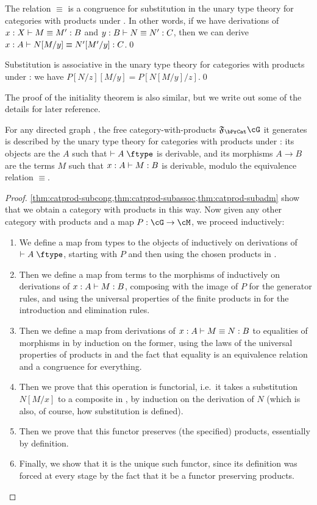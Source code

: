 \begin{lem}\label{thm:catprod-subcong}
  The relation $\equiv$ is a congruence for substitution in the unary type theory for categories with products under \cG.
  In other words, if we have derivations of $x:X \vdash M\equiv M':B$ and $y:B \vdash N\equiv N':C$, then we can derive $x:A \vdash N[M/y] \equiv N'[M'/y]:C$.\qed
\end{lem}

\begin{lem}\label{thm:catprod-subassoc}
  Substitution is associative in the unary type theory for categories with products under \cG: we have $P[N/z][M/y] = P[N[M/y]/z]$.\qed
\end{lem}

The proof of the initiality theorem is also similar, but we write out some of the details for later reference.

\begin{thm}\label{thm:catprod-initial}
  For any directed graph \cG, the free category-with-products $\F\bPrCat \cG$ it generates is described by the unary type theory for categories with products under \cG: its objects are the $A$ such that $\types A\type$ is derivable, and its morphisms $A\to B$ are the terms $M$ such that $x:A \vdash M:B$ is derivable, modulo the equivalence relation $\equiv$.
\end{thm}
\begin{proof}
  \cref{thm:catprod-subcong,thm:catprod-subassoc,thm:catprod-subadm} show that we obtain a category with products in this way.
  Now given any other category with products \cM and a map $P:\cG\to\cM$, we proceed inductively:
  \begin{enumerate}
  \item We define a map from types to the objects of \cM inductively on derivations of $\types A\type$, starting with $P$ and then using the chosen products in \cM.
  \item Then we define a map from terms to the morphisms of \cM inductively on derivations of $x:A \vdash M:B$, composing with the image of $P$ for the generator rules, and using the universal properties of the finite products in \cM for the introduction and elimination rules.
  \item Then we define a map from derivations of $x:A \vdash M\equiv N:B$ to equalities of morphisms in \cM by induction on the former, using the laws of the universal properties of products in \cM and the fact that equality is an equivalence relation and a congruence for everything.
  \item Then we prove that this operation is functorial, i.e.\ it takes a substitution $N[M/x]$ to a composite in \cM, by induction on the derivation of $N$ (which is also, of course, how substitution is defined).
  \item Then we prove that this functor preserves (the specified) products, essentially by definition.
  \item Finally, we show that it is the unique such functor, since its definition was forced at every stage by the fact that it be a functor preserving products.\qedhere
  \end{enumerate}
\end{proof}


